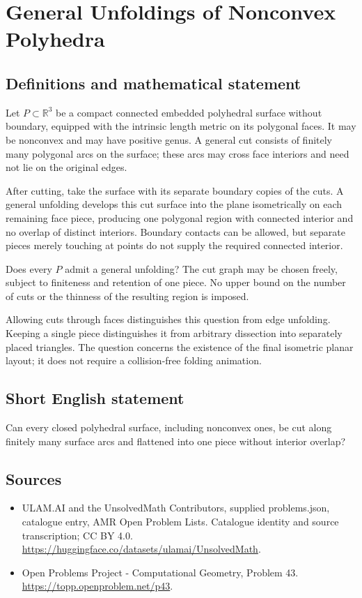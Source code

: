 \documentclass[11pt,a4paper]{article}
\begin{document}
\section*{General Unfoldings of Nonconvex Polyhedra}\label{statement}

\subsection{Definitions and mathematical statement}
Let $P\subset\mathbb R^3$ be a compact connected embedded polyhedral
surface without boundary, equipped with the intrinsic length metric
on its polygonal faces. It may be nonconvex and may have positive
genus. A general cut consists of finitely many polygonal arcs on
the surface; these arcs may cross face interiors and need not lie
on the original edges.

After cutting, take the surface with its separate boundary copies
of the cuts. A general unfolding develops this cut surface into
the plane isometrically on each remaining face piece, producing
one polygonal region with connected interior and no overlap of
distinct interiors. Boundary contacts can be allowed, but separate
pieces merely touching at points do not supply the required
connected interior.

Does every $P$ admit a general unfolding? The cut graph may be
chosen freely, subject to finiteness and retention of one piece.
No upper bound on the number of cuts or the thinness of the
resulting region is imposed.

Allowing cuts through faces distinguishes this question from edge
unfolding. Keeping a single piece distinguishes it from arbitrary
dissection into separately placed triangles. The question concerns
the existence of the final isometric planar layout; it does not
require a collision-free folding animation.
\subsection{Short English statement}
Can every closed polyhedral surface, including nonconvex ones, be
cut along finitely many surface arcs and flattened into one piece
without interior overlap?
\subsection{Sources}
\begin{itemize}
\item[S1] ULAM.AI and the UnsolvedMath Contributors, supplied problems.json, catalogue entry, AMR Open Problem Lists. Catalogue identity and source transcription; CC BY 4.0.
\url{https://huggingface.co/datasets/ulamai/UnsolvedMath}.
\item[S2] Open Problems Project - Computational Geometry, Problem 43. 
\url{https://topp.openproblem.net/p43}.
\end{itemize}
\end{document}
